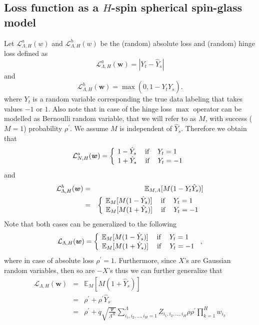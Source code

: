 \documentclass[twoside]{article}
\begin{document}
\subsection{Loss function as a $H$-spin spherical spin-glass model}

Let $\mathcal{L}^a_{\Lambda,H}(w)$ and $\mathcal{L}^h_{\Lambda,H}(w)$ be the (random) absolute loss and (random) hinge loss defined as
\[\mathcal{L}^a_{\Lambda,H}({\bm w}) = |Y_t - \hat{Y}_s|
\]
and
\[\mathcal{L}^h_{\Lambda,H}({\bm w}) = \max(0,1-Y_t\hat{Y}_s).
\]
where $Y_t$ is a random variable corresponding the true data labeling that takes values $-1$ or $1$. Also note that in case of the hinge loss $\max$ operator can be modelled as Bernoulli random variable, that we will refer to as $M$, with success ($M = 1$) probability $\rho^{'}$. We assume $M$ is independent of $\hat{Y}_s$. Therefore we obtain that
\[\mathcal{L}^a_{N,H}({\bm w}) = \left \{
  \begin{tabular}{c}
  $\!\!\!\!\!\!1 - \hat{Y}_s$ $\:\:\:\:$if$\:\:\:\:$ $Y_t = 1$ \\
  $\!1 + \hat{Y}_s$ $\:\:\:\:$if$\:\:\:\:$ $Y_t = -1$ \\
  \end{tabular}
\right.
\]
and
\begin{eqnarray*}
\mathcal{L}^h_{\Lambda,H}({\bm w}) &=& \mathbb{E}_{M,A}[M(1-Y_t\hat{Y}_s)]\\&=& \left \{
  \begin{tabular}{c}
  $\!\!\!\!\!\!\mathbb{E}_{M}[M(1 - \hat{Y}_s)]$ $\:\:\:\:$if$\:\:\:\:$ $Y_t = 1$ \\
  $\!\mathbb{E}_{M}[M(1 + \hat{Y}_s)]$ $\:\:\:\:$if$\:\:\:\:$ $Y_t = -1$ \\
  \end{tabular}
\right.
\end{eqnarray*}
Note that both cases can be generalized to the following
\[\mathcal{L}_{\Lambda,H}({\bm w}) = \left \{
  \begin{tabular}{c}
  $\!\!\!\!\!\!\mathbb{E}_{M}[M(1 - \hat{Y}_s)]$ $\:\:\:\:$if$\:\:\:\:$ $Y_t = 1$ \\
  $\!\mathbb{E}_{M}[M(1 + \hat{Y}_s)]$ $\:\:\:\:$if$\:\:\:\:$ $Y_t = -1$ \\
  \end{tabular}
\right.,
\]
where in case of absolute loss $\rho^{'} = 1$. Furthermore, since $X$'s are Gaussian random variables, then so are $-X$'s thus we can further generalize that
\begin{eqnarray*}
\mathcal{L}_{\Lambda,H}({\bm w}) \!\!\!\!\!&=&\!\!\!\!\! \mathbb{E}_{M}[M(1 + \hat{Y}_s)]\\
&=& \!\!\!\!\!\rho^{'} + \rho^{'}\hat{Y}_s\\
&=& \!\!\!\!\!\rho^{'} + q\sqrt{\!\frac{\Psi}{\Lambda^H}\!}\!\sum_{i_1,i_2,\dots,i_H=1}^{\Lambda}\!Z_{i_1,i_2,\dots,i_H}\rho\rho^{'}\prod_{k = 1}^{H}w_{i_k}
\end{eqnarray*}
\end{document}
